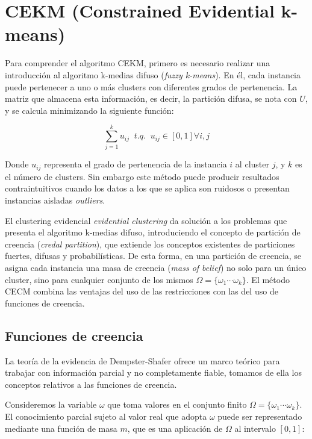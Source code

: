 \section{CEKM (Constrained Evidential k-means)}

Para comprender el algoritmo CEKM, primero es necesario realizar una introducción al algoritmo k-medias difuso (\textit{fuzzy k-means}). En él, cada instancia puede pertenecer a uno o más clusters con diferentes grados de pertenencia. La matriz que almacena esta información, es decir, la partición difusa, se nota con $U$, y se calcula minimizando la siguiente función:

\begin{equation}
\sum_{j=1}^{k} u_{ij} \;\; t.q. \;\; u_{ij} \in [0,1] \forall i,j
\label{eqn2}
\end{equation}

Donde $u_{ij}$ representa el grado de pertenencia de la instancia $i$ al cluster $j$, y $k$ es el número de clusters. Sin embargo este método puede producir resultados contraintuitivos cuando los datos a los que se aplica son ruidosos o presentan instancias aisladas \textit{outliers}.

El clustering evidencial \textit{evidential clustering} da solución a los problemas que presenta el algoritmo k-medias difuso, introduciendo el concepto de partición de creencia (\textit{credal partition}), que extiende los conceptos existentes de particiones fuertes, difusas y probabilísticas. De esta forma, en una partición de creencia, se asigna cada instancia una masa de creencia (\textit{mass of belief}) no solo para un único cluster, sino para cualquier conjunto de los mismos $\Omega = \{\omega_1 \cdots \omega_k \}$. El método CECM combina las ventajas del uso de las restricciones con las del uso de funciones de creencia.

\subsection{Funciones de creencia}

La teoría de la evidencia de Dempster-Shafer ofrece un marco teórico para trabajar con información parcial y no completamente fiable, tomamos de ella los conceptos relativos a las funciones de creencia.

Consideremos la variable $\omega$ que toma valores en el conjunto finito $\Omega = \{\omega_1 \cdots \omega_k \}$. El conocimiento parcial sujeto al valor real que adopta $\omega$ puede ser representado mediante una función de masa $m$, que es una aplicación de $\Omega$ al intervalo $[0,1]$:

